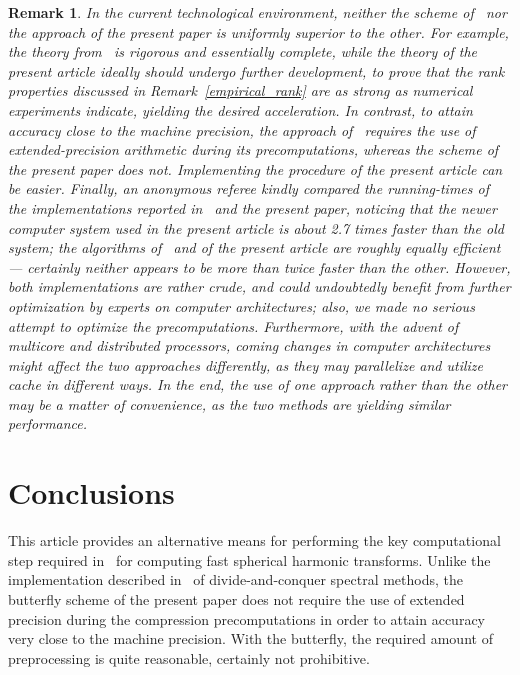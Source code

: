 \documentclass[final,3p,times]{elsarticle}
\newtheorem{remark1}[theorem]{Remark}
\newenvironment{remark}{\begin{remark1}\rm}{\end{remark1}}
\begin{document}
\begin{remark}
In the current technological environment,
neither the scheme of~\cite{tygert_sph} nor the approach of the present paper
is uniformly superior to the other.
For example, the theory from~\cite{tygert_sph} is rigorous
and essentially complete, while the theory of the present article ideally
should undergo further development, to prove that the rank properties discussed
in Remark~\ref{empirical_rank} are as strong as numerical experiments indicate,
yielding the desired acceleration.
In contrast, to attain accuracy close to the machine precision,
the approach of~\cite{tygert_sph} requires the use of extended-precision
arithmetic during its precomputations,
whereas the scheme of the present paper does not.
Implementing the procedure of the present article can be easier.
Finally, an anonymous referee kindly compared the running-times
of the implementations reported in~\cite{tygert_sph} and the present paper,
noticing that the newer computer system used in the present article is
about 2.7 times faster than the old system; the algorithms of~\cite{tygert_sph}
and of the present article are roughly equally efficient ---
certainly neither appears to be more than twice faster than the other.
However, both implementations are rather crude, and could undoubtedly benefit
from further optimization by experts on computer architectures;
also, we made no serious attempt to optimize the precomputations.
Furthermore, with the advent of multicore and distributed processors,
coming changes in computer architectures might affect
the two approaches differently, as they may parallelize and utilize cache
in different ways.
In the end, the use of one approach rather than the other may be
a matter of convenience, as the two methods are yielding similar performance.
\end{remark}



\section{Conclusions}
\label{conclusions}

This article provides an alternative means for performing the key
computational step required in~\cite{tygert_sph} for computing
fast spherical harmonic transforms.
Unlike the implementation described in~\cite{tygert_sph}
of divide-and-conquer spectral methods,
the butterfly scheme of the present paper does not require the use
of extended precision during the compression precomputations in order
to attain accuracy very close to the machine precision.
With the butterfly, the required amount of preprocessing is quite reasonable,
certainly not prohibitive.
\end{document}
